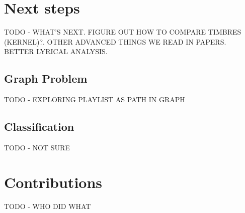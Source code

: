 \documentclass[10pt,journal,compsoc]{IEEEtran}
\begin{document}
\section{Next steps}
TODO - WHAT'S NEXT. FIGURE OUT HOW TO COMPARE TIMBRES (KERNEL)?. OTHER ADVANCED THINGS WE READ IN PAPERS. BETTER LYRICAL ANALYSIS.

\subsection{Graph Problem}
TODO - EXPLORING PLAYLIST AS PATH IN GRAPH

\subsection{Classification}
TODO - NOT SURE

\section{Contributions}
TODO - WHO DID WHAT

{}


%

\end{document}
